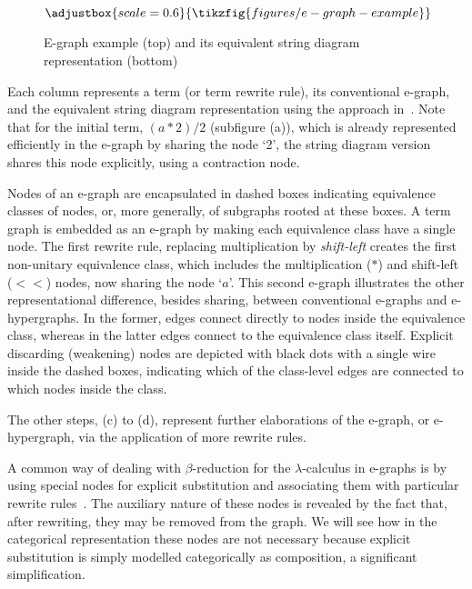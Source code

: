 \begin{figure*}[h!]
\[
\adjustbox{scale=0.6}{
\tikzfig{figures/e-graph-example}
}
\]
\caption{E-graph example (top) and its equivalent string diagram representation (bottom)~\cite{ghica2024equivalencehypergraphsegraphsmonoidal}}
\label{fig:e-graph-example}
\end{figure*}

Each column represents a term (or term rewrite rule), its conventional e-graph, and the equivalent string diagram representation using the approach in~\cite{ghica2024equivalencehypergraphsegraphsmonoidal}. 
Note that for the initial term, $(a*2)/2$ (subfigure (a)), which is already represented efficiently in the e-graph by sharing the node `2', the string diagram version shares this node explicitly, using a contraction node.

Nodes of an e-graph are encapsulated in dashed boxes indicating equivalence classes of nodes, or, more generally, of subgraphs rooted at these boxes.
A term graph is embedded as an e-graph by making each equivalence class have a single node.
The first rewrite rule, replacing multiplication by \emph{shift-left} creates the first non-unitary equivalence class, which includes the multiplication ($*$) and shift-left ($<\!\!<$) nodes,  now sharing the node `$a$'.
This second e-graph illustrates the other representational difference, besides sharing, between conventional e-graphs and e-hypergraphs.
In the former, edges connect directly to nodes inside the equivalence class, whereas in the latter edges connect to the equivalence class itself.
Explicit discarding (weakening) nodes are depicted with black dots with a single wire
inside the dashed boxes, indicating which of the class-level edges are connected to which nodes inside the class.

The other steps, (c) to (d), represent further elaborations of the e-graph, or e-hypergraph, via the application of more rewrite rules.

A common way of dealing with $\beta$-reduction for the $\lambda$-calculus in e-graphs is by using special nodes for explicit substitution and associating them with particular rewrite rules~\cite{EggPaper,koehler2022sketchguided}.
The auxiliary nature of these nodes is revealed by the fact that, after rewriting, they may be removed from the graph. 
We will see how in the categorical representation these nodes are not necessary because explicit substitution is simply modelled categorically as composition, a significant simplification.

